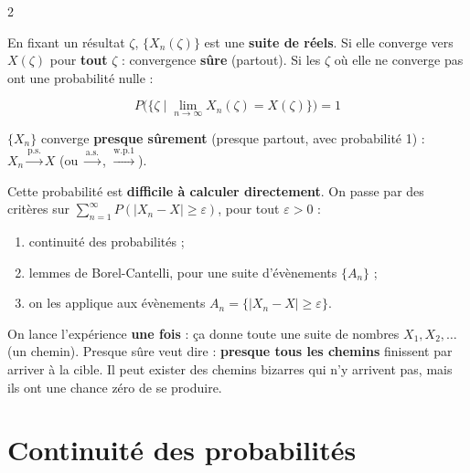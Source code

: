 \documentclass[a4paper,9pt]{extarticle}
\begin{document}
\begin{multicols}{2}
\begin{definition}

En fixant un résultat $\zeta$, $\{X_n(\zeta)\}$ est une \textbf{suite de réels}. Si elle
converge vers $X(\zeta)$ pour \textbf{tout} $\zeta$ : convergence \textbf{sûre} (partout). Si
les $\zeta$ où elle ne converge pas ont une probabilité nulle :

\[
P\big(\{\zeta \mid \lim_{n\to\infty}X_n(\zeta) = X(\zeta)\}\big) = 1
\]

$\{X_n\}$ converge \textbf{presque sûrement} (presque partout, avec probabilité 1) :
$X_n \xrightarrow{\text{p.s.}} X$ (ou $\xrightarrow{\text{a.s.}}$, $\xrightarrow{\text{w.p.1}}$).

\end{definition}


\begin{important}

Cette probabilité est \textbf{difficile à calculer directement}. On passe par des critères
sur $\sum_{n=1}^\infty P(|X_n - X| \ge \varepsilon)$, pour tout $\varepsilon > 0$ :

\begin{enumerate}[leftmargin=*,itemsep=1pt,topsep=1pt]

\item continuité des probabilités ;

\item lemmes de Borel-Cantelli, pour une suite d'évènements $\{A_n\}$ ;

\item on les applique aux évènements $A_n = \{|X_n - X| \ge \varepsilon\}$.

\end{enumerate}

\end{important}


\begin{simple}

On lance l'expérience \textbf{une fois} : ça donne toute une suite de nombres $X_1, X_2,
\dots$ (un chemin). Presque sûre veut dire : \textbf{presque tous les chemins} finissent par
arriver à la cible. Il peut exister des chemins bizarres qui n'y arrivent pas, mais ils ont
une chance zéro de se produire.

\end{simple}


\section{Continuité des probabilités}



\end{multicols}
\end{document}
